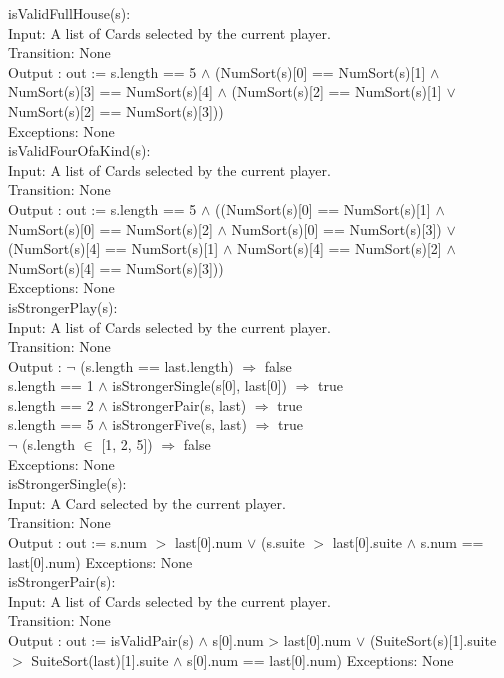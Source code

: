 \documentclass[12pt, titlepage]{article}
\begin{document}
\noindent isValidFullHouse(s):\\
Input: A list of Cards selected by the current player.\\
Transition: None\\
Output : out := s.length == 5 $\land$ (NumSort(s)[0] == NumSort(s)[1] $\land$ NumSort(s)[3] == NumSort(s)[4] $\land$ (NumSort(s)[2] == NumSort(s)[1] $\lor$ NumSort(s)[2] == NumSort(s)[3])) \\
Exceptions: None\\

\noindent isValidFourOfaKind(s):\\
Input: A list of Cards selected by the current player.\\
Transition: None\\
Output : out := s.length == 5 $\land$ ((NumSort(s)[0] == NumSort(s)[1] $\land$ NumSort(s)[0] == NumSort(s)[2] $\land$ NumSort(s)[0] == NumSort(s)[3]) $\lor$ (NumSort(s)[4] == NumSort(s)[1] $\land$ NumSort(s)[4] == NumSort(s)[2] $\land$ NumSort(s)[4] == NumSort(s)[3])) \\
Exceptions: None\\

\noindent isStrongerPlay(s):\\
Input: A list of Cards selected by the current player.\\
Transition: None\\
Output : $\lnot$ (s.length == last.length) $\Rightarrow$ false\\
s.length == 1 $\land$ isStrongerSingle(s[0], last[0]) $\Rightarrow$ true\\
s.length == 2 $\land$ isStrongerPair(s, last) $\Rightarrow$ true\\
s.length == 5 $\land$ isStrongerFive(s, last) $\Rightarrow$ true\\
$\lnot$ (s.length $\in$ [1, 2, 5]) $\Rightarrow$ false\\
Exceptions: None\\

\noindent isStrongerSingle(s):\\
Input: A Card selected by the current player.\\
Transition: None\\
Output : out := s.num $>$ last[0].num $\lor$ (s.suite $>$ last[0].suite $\land$ s.num == last[0].num) 
Exceptions: None\\

\noindent isStrongerPair(s):\\
Input: A list of Cards selected by the current player.\\
Transition: None\\
Output : out := isValidPair(s) $\land$ s[0].num > last[0].num $\lor$ (SuiteSort(s)[1].suite $>$ SuiteSort(last)[1].suite $\land$ s[0].num == last[0].num) 
Exceptions: None\\
\end{document}
